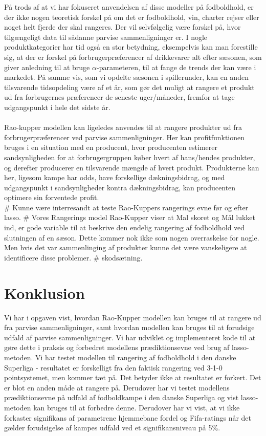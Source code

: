 \documentclass[11pt,a4paper]{article}
\begin{document}
På trods af at vi har fokuseret anvendelsen af disse modeller på fodboldhold, er der ikke nogen teoretisk forskel på om det er fodboldhold, vin, charter rejser eller noget helt fjerde der skal rangeres. Der vil selvfølgelig være forskel på, hvor tilgængeligt data til sådanne parvise sammenligninger er. I nogle produktkategorier har tid også en stor betydning, eksempelvis kan man forestille sig, at der er forskel på forbrugerpræferencer af drikkevarer alt efter sæsonen, som giver anledning til at bruge $\alpha$-parameteren, til at fange de trends der kan være i markedet. På samme vis, som vi opdelte sæsonen i spillerunder, kan en anden tilsvarende tidsopdeling være af et år, som gør det muligt at rangere et produkt ud fra forbrugernes præferencer de seneste uger/måneder, fremfor at tage udgangspunkt i hele det sidste år. \\\\
Rao-kupper modellen kan ligeledes anvendes til at rangere produkter ud fra forbrugerpræferencer ved parvise sammenligninger.  
Her kan profitfunktionen bruges i en situation med en producent, hvor producenten estimerer sandsynligheden for at forbrugergruppen køber hvert af hans/hendes produkter, og derefter producerer en tilsvarende mængde af hvert produkt. Produkterne kan her, ligesom kampe har odds, have forskellige dækningsbidrag, og med udgangspunkt i sandsynligheder kontra dækningsbidrag, kan producenten optimere sin forventede profit. \\
\# Kunne være interresandt at teste Rao-Kuppers rangerings evne før og efter lasso.
\# Vores Rangerings model  Rao-Kupper viser at Mal skoret og Mål lukket ind, er gode variable til at beskrive den endelig rangering af fodboldhold ved slutningen af en sæson. Dette kommer nok ikke som nogen overraskelse for nogle. Men hvis det var sammenlinging af produkter kunne det være vanskeligere at identificere disse problemer. \# skodsætning.
\section{Konklusion}


Vi har i opgaven vist, hvordan Rao-Kupper modellen kan bruges til at rangere ud fra parvise sammenligninger, samt hvordan modellen kan bruges til at forudsige udfald af parvise sammenligninger. Vi har udviklet og implementeret kode til at gøre dette i praksis og forbedret modellens prædiktionsevne ved brug af lasso-metoden. Vi har testet modellen til rangering af fodboldhold i den danske Superliga - resultatet er forskelligt fra den faktisk rangering ved 3-1-0 pointsystemet, men kommer tæt på. Det betyder ikke at resultatet er forkert. Det er blot en anden måde at rangere på. Derudover har vi testet modellens prædiktionsevne på udfald af fodboldkampe i den danske Superliga og vist lasso-metoden kan bruges til at forbedre denne. Derudover har vi vist, at vi ikke forkaster signifikans af parametrene hjemmebane fordel og Fifa-ratings når det gælder forudsigelse af kampes udfald ved et signifikansniveau på 5\%. 
\\
\end{document}
